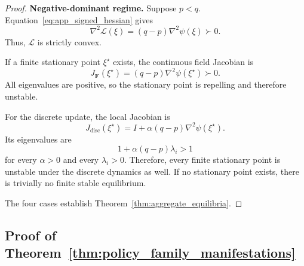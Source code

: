 \documentclass{article}
\theoremstyle{plain}
\theoremstyle{definition}
\theoremstyle{remark}
\begin{document}
\begin{proof}
\medskip
\noindent\textbf{Negative-dominant regime.}
Suppose \(p<q\). Equation~\eqref{eq:app_signed_hessian} gives
\begin{equation}
    \nabla^2\mathcal L(\xi)
    =
    (q-p)
    \nabla^2\psi(\xi)
    \succ0.
\end{equation}
Thus, \(\mathcal L\) is strictly convex.

If a finite stationary point \(\xi^\star\) exists, the continuous field
Jacobian is
\begin{equation}
    J_{\mathbf F}(\xi^\star)
    =
    (q-p)
    \nabla^2\psi(\xi^\star)
    \succ0.
    \label{eq:app_negative_continuous_jacobian}
\end{equation}
All eigenvalues are positive, so the stationary point is repelling and
therefore unstable.

For the discrete update, the local Jacobian is
\begin{equation}
    J_{\mathrm{disc}}(\xi^\star)
    =
    I
    +
    \alpha(q-p)
    \nabla^2\psi(\xi^\star).
    \label{eq:app_negative_discrete_jacobian}
\end{equation}
Its eigenvalues are
\[
    1+\alpha(q-p)\lambda_i
    >
    1
\]
for every \(\alpha>0\) and every \(\lambda_i>0\). Therefore, every finite
stationary point is unstable under the discrete dynamics as well. If no
stationary point exists, there is trivially no finite stable equilibrium.

The four cases establish
Theorem~\ref{thm:aggregate_equilibria}.
\end{proof}


\subsection{Proof of
Theorem~\ref{thm:policy_family_manifestations}}
\label{app:policy_family_manifestations}
\end{document}
